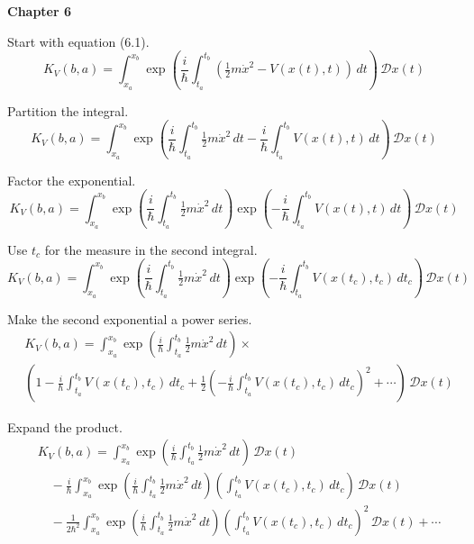 \documentclass[12pt]{article}
\begin{document}
{\bf Chapter 6}

\bigskip
Start with equation (6.1).
\begin{equation*}
K_V(b,a)=\int_{x_a}^{x_b}\exp\left(
\frac{i}{\hbar}
\int_{t_a}^{t_b}
\left(\tfrac{1}{2}m\dot x^2-V(x(t),t)\right)
\,dt\right)\,\mathcal Dx(t)
\tag{6.1}
\end{equation*}

Partition the integral.
\begin{equation*}
K_V(b,a)=\int_{x_a}^{x_b}
\exp\left(
\frac{i}{\hbar}
\int_{t_a}^{t_b}\tfrac{1}{2}m\dot x^2
\,dt
-
\frac{i}{\hbar}
\int_{t_a}^{t_b}V(x(t),t)
\,dt
\right)\,\mathcal Dx(t)
\end{equation*}

Factor the exponential.
\begin{equation*}
K_V(b,a)=\int_{x_a}^{x_b}
\exp\left(\frac{i}{\hbar}\int_{t_a}^{t_b}\tfrac{1}{2}m\dot x^2\,dt\right)
\exp\left(-\frac{i}{\hbar}\int_{t_a}^{t_b}V(x(t),t)\,dt\right)
\,\mathcal Dx(t)
\end{equation*}

Use $t_c$ for the measure in the second integral.
\begin{equation*}
K_V(b,a)=\int_{x_a}^{x_b}
\exp\left(\frac{i}{\hbar}\int_{t_a}^{t_b}\tfrac{1}{2}m\dot x^2\,dt\right)
\exp\left(-\frac{i}{\hbar}\int_{t_a}^{t_b}V(x(t_c),t_c)\,dt_c\right)
\,\mathcal Dx(t)
\end{equation*}

Make the second exponential a power series.
\begin{align*}
&K_V(b,a)=\int_{x_a}^{x_b}\exp\left(\frac{i}{\hbar}\int_{t_a}^{t_b}\tfrac{1}{2}m\dot x^2\,dt\right)\times{}
\\
&\left(1
-\frac{i}{\hbar}\int_{t_a}^{t_b}V(x(t_c),t_c)\,dt_c
+\frac{1}{2}\left(-\frac{i}{\hbar}\int_{t_a}^{t_b}V(x(t_c),t_c)\,dt_c\right)^2
+\cdots
\right)\,\mathcal Dx(t)
\end{align*}

Expand the product.
\begin{align*}
&K_V(b,a)=\int_{x_a}^{x_b}\exp\left(\frac{i}{\hbar}\int_{t_a}^{t_b}\tfrac{1}{2}m\dot x^2\,dt\right)\,\mathcal Dx(t)
\\
&\quad{}-\frac{i}{\hbar}
\int_{x_a}^{x_b}\exp\left(\frac{i}{\hbar}\int_{t_a}^{t_b}\tfrac{1}{2}m\dot x^2\,dt\right)
\left(\int_{t_a}^{t_b}V(x(t_c),t_c)\,dt_c\right)\,\mathcal Dx(t)
\\
&\quad{}-\frac{1}{2\hbar^2}
\int_{x_a}^{x_b}\exp\left(\frac{i}{\hbar}\int_{t_a}^{t_b}\tfrac{1}{2}m\dot x^2\,dt\right)
\left(\int_{t_a}^{t_b}V(x(t_c),t_c)\,dt_c\right)^2\,\mathcal Dx(t)
+\cdots
\end{align*}
\end{document}
